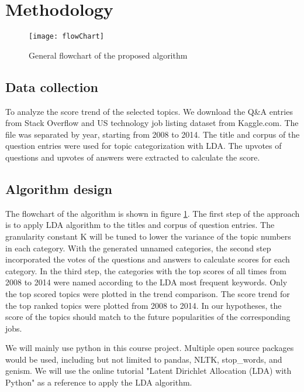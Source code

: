 \section{Methodology}

\begin{figure}[h]
	\center
	\texttt{[image: flowChart]}
    \caption{General flowchart of the proposed algorithm}
    \label{fig:flowChart}
\end{figure}


\subsection{Data collection}
To analyze the score trend of the selected topics. We download the Q\&A entries from Stack Overflow and US technology job listing dataset from Kaggle.com. The file was separated by year, starting from 2008 to 2014. The title and corpus of the question entries were used for topic categorization with LDA. The upvotes of questions and upvotes of answers were extracted to calculate the score.

\subsection{Algorithm design}
The flowchart of the algorithm is shown in figure \ref{fig:flowChart}. The first step of the approach is to apply LDA algorithm to the titles and corpus of question entries. The granularity constant K will be tuned to lower the variance of the topic numbers in each category.
With the generated unnamed categories, the second step incorporated the votes of the questions and answers to calculate scores for each category.
In the third step, the categories with the top scores of all times from 2008 to 2014 were named according to the LDA most frequent keywords. Only the top scored topics were plotted in the trend comparison.
The score trend for the top ranked topics were plotted from 2008 to 2014. In our hypotheses, the score of the topics should match to the future popularities of the corresponding jobs.


We will mainly use python in this course project. Multiple open source packages would be used, including but not limited to pandas, NLTK, stop\_words, and genism. We will use the online tutorial "Latent Dirichlet Allocation (LDA) with Python" \cite{T1_Paper} as a reference to apply the LDA algorithm. 



